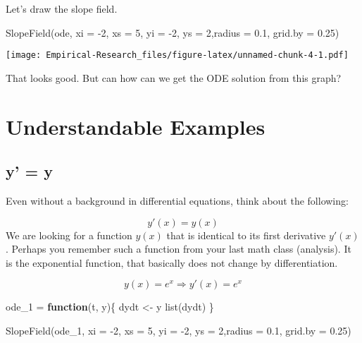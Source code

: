 \documentclass[
]{book}
\newenvironment{Shaded}{\begin{snugshade}}{\end{snugshade}}
\newcommand{\AttributeTok}[1]{\textcolor[rgb]{0.77,0.63,0.00}{#1}}
\newcommand{\ControlFlowTok}[1]{\textcolor[rgb]{0.13,0.29,0.53}{\textbf{#1}}}
\newcommand{\DecValTok}[1]{\textcolor[rgb]{0.00,0.00,0.81}{#1}}
\newcommand{\FloatTok}[1]{\textcolor[rgb]{0.00,0.00,0.81}{#1}}
\newcommand{\FunctionTok}[1]{\textcolor[rgb]{0.00,0.00,0.00}{#1}}
\newcommand{\NormalTok}[1]{#1}
\newcommand{\OtherTok}[1]{\textcolor[rgb]{0.56,0.35,0.01}{#1}}
\newcommand{\SpecialCharTok}[1]{\textcolor[rgb]{0.00,0.00,0.00}{#1}}
\begin{document}
Let's draw the slope field.

\begin{Shaded}
\begin{Highlighting}[]
\FunctionTok{SlopeField}\NormalTok{(ode, }\AttributeTok{xi =} \SpecialCharTok{{-}}\DecValTok{2}\NormalTok{, }\AttributeTok{xs =} \DecValTok{5}\NormalTok{, }\AttributeTok{yi =} \SpecialCharTok{{-}}\DecValTok{2}\NormalTok{, }\AttributeTok{ys =} \DecValTok{2}\NormalTok{,}\AttributeTok{radius =} \FloatTok{0.1}\NormalTok{, }\AttributeTok{grid.by =} \FloatTok{0.25}\NormalTok{)}
\end{Highlighting}
\end{Shaded}

\texttt{[image: Empirical-Research\_files/figure-latex/unnamed-chunk-4-1.pdf]}

That looks good. But can how can we get the ODE solution from this graph?

\hypertarget{understandable-examples}{%
\section{Understandable Examples}\label{understandable-examples}}

\hypertarget{y-y}{%
\subsection{y' = y}\label{y-y}}

Even without a background in differential equations, think about the following:

\[y'(x) = y(x)\]
We are looking for a function \(y(x)\) that is identical to its first derivative \(y'(x)\). Perhaps you remember such a function from your last math class (analysis). It is the exponential function, that basically does not change by differentiation.

\[y(x) = e^x \Rightarrow y'(x) = e^x \]

\begin{Shaded}
\begin{Highlighting}[]
\NormalTok{ode\_1 }\OtherTok{=} \ControlFlowTok{function}\NormalTok{(t, y)\{}
\NormalTok{  dydt }\OtherTok{\textless{}{-}}\NormalTok{ y}
  \FunctionTok{list}\NormalTok{(dydt)}
\NormalTok{\}}

\FunctionTok{SlopeField}\NormalTok{(ode\_1, }\AttributeTok{xi =} \SpecialCharTok{{-}}\DecValTok{2}\NormalTok{, }\AttributeTok{xs =} \DecValTok{5}\NormalTok{, }\AttributeTok{yi =} \SpecialCharTok{{-}}\DecValTok{2}\NormalTok{, }\AttributeTok{ys =} \DecValTok{2}\NormalTok{,}\AttributeTok{radius =} \FloatTok{0.1}\NormalTok{, }\AttributeTok{grid.by =} \FloatTok{0.25}\NormalTok{)}
\end{Highlighting}
\end{Shaded}
\end{document}
